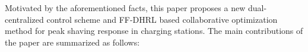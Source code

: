 \documentclass[preprint,12pt]{elsarticle}
\begin{document}

Motivated by the aforementioned facts, this paper proposes a new dual-centralized control scheme and FF-DHRL based collaborative optimization method for peak shaving response in charging stations. The main contributions of the paper are summarized as follows:
\end{document}
